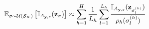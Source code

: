 $$\mathbb E_{\sigma \sim \mathcal U(\mathcal S_K)} \left [ \mathbb I_{A_{\mathbf{y},\varepsilon}}(\mathbf{z}_{\sigma}) \right] \approx \sum_{h=1}^H \frac{1}{L_{h}} \sum_{l=1}^{L_{h}}\frac { \mathbb I_{A_{\mathbf{y},\varepsilon}}(\mathbf{z}_{\sigma_l^{(h)}})}{\rho_h(\sigma_l^{(h)})} $$








